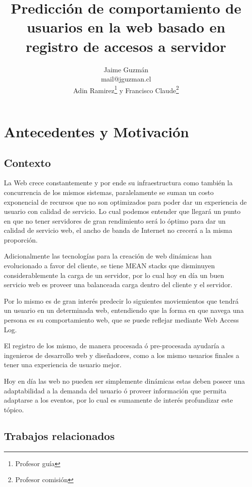 \documentclass{udparticle}
\title{ Predicción de comportamiento de usuarios en la web basado en registro de accesos a servidor }
\author{  
  Jaime Guzmán\\{\small\ttfamily mail@jguzman.cl}\protect\\[5pt]%
  {\small Adin Ramirez\thanks{Profesor guía} y Francisco Claude\thanks{Profesor comisión}}%
  }
\begin{document}
\maketitle

\section{Antecedentes y Motivación}

\subsection{Contexto}


La Web crece constantemente y por ende su infraestructura como también la concurrencia de los mismos sistemas, paralelamente se suman un costo exponencial de recursos que no son optimizados para poder dar un experiencia de usuario con calidad de servicio.
Lo cual podemos entender que llegará un punto en que no tener servidores de gran rendimiento será lo óptimo para dar un calidad de servicio web, el ancho de banda de Internet no crecerá a la misma proporción.


Adicionalmente las tecnologías para la creación de  web dinámicas han evolucionado a favor del cliente, se tiene MEAN stacks que disminuyen considerablemente la carga de un servidor, por lo cual hoy en día un buen servicio web  es proveer una balanceada carga dentro del cliente y el servidor.

Por lo mismo es de gran interés predecir lo siguientes moviemientos que tendrá un usuario en un determinada web, entendiendo que la forma en que navega una persona es su comportamiento web, que se puede reflejar mediante Web Access Log.

El registro de los mismo, de manera procesada ó pre-procesada ayudaría a ingenieros de desarrollo web y diseñadores, como a los mismo usuarios finales a tener una experiencia de usuario mejor.

Hoy en día las web no pueden ser simplemente dinámicas estas deben poseer una adaptabilidad a la demanda del usuario ó proveer información que permita adaptarse a los eventos, por lo cual es sumamente de interés profundizar este tópico.








 

\subsection{Trabajos relacionados}
\end{document}
